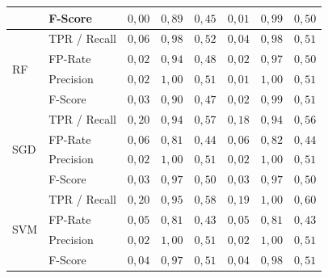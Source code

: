 \begin{table}
{\begin{tabular}{|ll|rrr|rrr|}
                     & F-Score      & $0,00$             & $0,89$                 & $0,45$                     & $0,01$             & $0,99$                 & $0,50$                      \\ 
\hline
\multirow{4}{*}{RF}  & TPR / Recall & $0,06$             & $0,98$                 & $0,52$                     & $0,04$             & $0,98$                 & $0,51$                      \\
                     & FP-Rate      & $0,02$             & $0,94$                 & $0,48$                     & $0,02$             & $0,97$                 & $0,50$                      \\
                     & Precision    & $0,02$             & $1,00$                 & $0,51$                     & $0,01$             & $1,00$                 & $0,51$                      \\
                     & F-Score      & $0,03$             & $0,90$                 & $0,47$                     & $0,02$             & $0,99$                 & $0,51$                      \\ 
\hline
\multirow{4}{*}{SGD} & TPR / Recall & $0,20$             & $0,94$                 & $0,57$                     & $0,18$             & $0,94$                 & $0,56$                      \\
                     & FP-Rate      & $0,06$             & $0,81$                 & $0,44$                     & $0,06$             & $0,82$                 & $0,44$                      \\
                     & Precision    & $0,02$             & $1,00$                 & $0,51$                     & $0,02$             & $1,00$                 & $0,51$                      \\
                     & F-Score      & $0,03$             & $0,97$                 & $0,50$                     & $0,03$             & $0,97$                 & $0,50$                      \\ 
\hline
\multirow{4}{*}{SVM} & TPR / Recall & $0,20$             & $0,95$                 & $0,58$                     & $0,19$             & $1,00$                 & $0,60$                      \\
                     & FP-Rate      & $0,05$             & $0,81$                 & $0,43$                     & $0,05$             & $0,81$                 & $0,43$                      \\
                     & Precision    & $0,02$             & $1,00$                 & $0,51$                     & $0,02$             & $1,00$                 & $0,51$                      \\
                     & F-Score      & $0,04$             & $0,97$                 & $0,51$                     & $0,04$             & $0,98$                 & $0,51$                      \\
\hline
\end{tabular}
}
\end{table}


